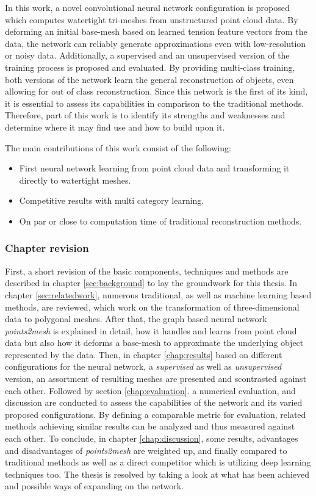   In this work, a novel convolutional neural network configuration is proposed which computes watertight tri-meshes from unstructured point cloud data.
  By deforming an initial base-mesh based on learned tension feature vectors from the data, the network can reliably generate approximations
  even with low-resolution or noisy data. Additionally, a supervised and an unsupervised version of the training process is proposed and evaluated. 
  By providing multi-class training, both versions of the network learn the general reconstruction of objects, even allowing for out of class reconstruction.
  Since this network is the first of its kind, it is essential to assess its capabilities in comparison to the traditional methods. 
  Therefore, part of this work is to identify its strengths and weaknesses and determine where it may find use and how to build upon it.

  The main contributions of this work consist of the following:
  \begin{itemize}
    \item First neural network learning from point cloud data and transforming it directly to watertight meshes.
    \item Competitive results with multi category learning.
    \item On par or close to computation time of traditional reconstruction methods.
  \end{itemize}

  \subsubsection*{Chapter revision}
  First, a short revision of the basic components, techniques and methods are described in chapter \ref{sec:background} to lay the groundwork for this thesis. In chapter \ref{sec:relatedwork}, 
  numerous traditional, as well as machine learning based methods, are reviewed, which work on the transformation of three-dimensional data to polygonal
  meshes.
  After that, the graph based neural network \emph{points2mesh} is explained in detail, how it handles and learns from point cloud data but also how
  it deforms a base-mesh to approximate the underlying object represented by the data.
  Then, in chapter \ref{chap:results} based on different configurations for the neural network, a \emph{supervised} as well as \emph{unsupervised} version,
  an assortment of resulting meshes are presented and scontrasted against each other.
  Followed by section \ref{chap:evaluation}. a numerical evaluation, and discussion are conducted to assess the capabilities of the network and its 
  varied proposed configurations. By defining a comparable metric for evaluation, related methods achieving similar results can be analyzed and thus 
  measured against each other. To conclude, in chapter \ref{chap:discussion}, some results, advantages and disadvantages of \emph{points2mesh} 
  are weighted up, and finally compared to traditional methods as well as a direct competitor which is utilizing deep learning techniques too.
  The thesis is resolved by taking a look at what has been achieved and possible ways of expanding on the network.